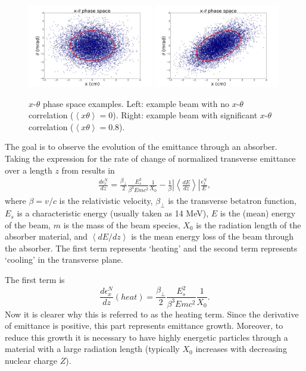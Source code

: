 \begin{figure}
  \begin{center}
    \includegraphics[width=0.49\textwidth]{Figures/ellipse0} 
    \includegraphics[width=0.49\textwidth]{Figures/ellipse1} 
  \caption[$x$-$\theta$ phase space examples.]{$x$-$\theta$ phase space examples. Left: example beam with no $x$-$\theta$ correlation ($\left<x\theta\right>=0$). Right: example beam with significant $x$-$\theta$ correlation ($\left<x\theta\right>=0.8$).}
  \label{fig:ellipses}
 \end{center}
\end{figure}

The goal is to observe the evolution of the emittance through an absorber. Taking the expression for the rate of change of normalized transverse emittance over a length $z$ from \cite{neuffer_intro} results in
\begin{align*}
\frac{d\epsilon^N _x}{dz}=\frac{\beta_\perp}{2}\frac{E_s^2}{\beta^3Emc^2}\frac{1}{X_0}-\frac{1}{\beta}\left| \left<\frac{dE}{dz}\right>\right| \frac{\epsilon_x^N}{E},
\end{align*}
where $\beta=v/c$ is the relativistic velocity, $\beta_\perp$ is the transverse betatron function, $E_s$ is a characteristic energy (usually taken as 14 MeV), $E$ is the (mean) energy of the beam, $m$ is the mass of the beam species, $X_0$ is the radiation length of the absorber material, and $\left<dE/dz\right>$ is the mean energy loss of the beam through the absorber. The first term represents `heating' and the second term represents `cooling' in the transverse plane. 

The first term is
\begin{equation}
\label{eqn:emittanceheat}
\frac{d\epsilon_x^N}{dz}(heat) = \frac{\beta_\perp}{2}\frac{E_s^2}{\beta^3Emc^2}\frac{1}{X_0}.
\end{equation}
Now it is clearer why this is referred to as the heating term. Since the derivative of emittance is positive, this part represents emittance growth. Moreover, to reduce this growth it is necessary to have highly energetic particles through a material with a large radiation length (typically $X_0$ increases with decreasing nuclear charge $Z$).

